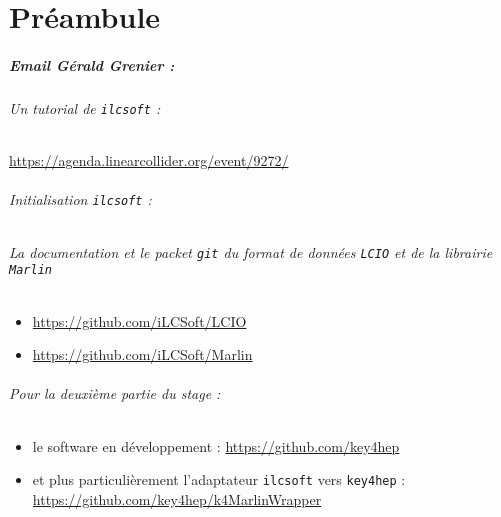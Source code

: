 \chapter*{Préambule}

\paragraph{Email Gérald Grenier :}

\subparagraph{Un tutorial de \texttt{ilcsoft} :} 
\url{https://agenda.linearcollider.org/event/9272/}

\subparagraph{Initialisation \texttt{ilcsoft} :}

\subparagraph{La documentation et le packet \texttt{git} du format de données \texttt{LCIO} et de la librairie \texttt{Marlin}}
\begin{itemize}
	\item \url{https://github.com/iLCSoft/LCIO} \cite{Gaede:2003ip}
	\item \url{https://github.com/iLCSoft/Marlin}
\end{itemize}


\subparagraph{Pour la deuxième partie du stage :}
\begin{itemize}

	\item le software en développement : 
			\url{https://github.com/key4hep}
			
	\item et plus particulièrement l'adaptateur \texttt{ilcsoft} vers \texttt{key4hep} : 
			\url{https://github.com/key4hep/k4MarlinWrapper}
			
\end{itemize}  
 \cite{einstein}